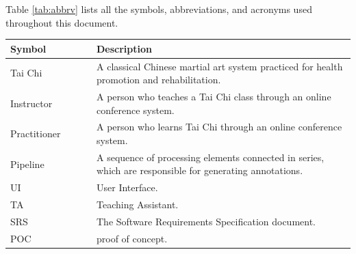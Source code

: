\documentclass[12pt, titlepage]{article}
\begin{document}
Table \ref{tab:abbrv} lists all the symbols, abbreviations, and acronyms used
throughout this document.
\renewcommand{\arraystretch}{1.2}
\begin{table}[H]
  \centering
  \begin{tabular}{L{0.25\linewidth}L{0.8\linewidth}} \toprule
    \textbf{Symbol}                  & \textbf{Description}                                                                                                                                                                     \\ \midrule
    Tai Chi                    & A classical Chinese martial art system practiced for health promotion and rehabilitation.                                                                                          \\
    Instructor                 & A person who teaches a Tai Chi class through an online conference system.                                                                                                          \\
    Practitioner               & A person who learns Tai Chi through an online conference system.                                                                                                                   \\
    Pipeline                   & A sequence of processing elements connected in series, which are responsible for generating annotations.                                                                           \\
    UI                         & User Interface.                                                                                                                                                                    \\
    TA                         & Teaching Assistant.                                                                                                                                                                \\
    SRS                        & The Software Requirements Specification document.                                                                                                                                  \\
    POC                        & proof of concept.                                                                                                                                                                  \\

\end{tabular}
\end{table}
\end{document}
